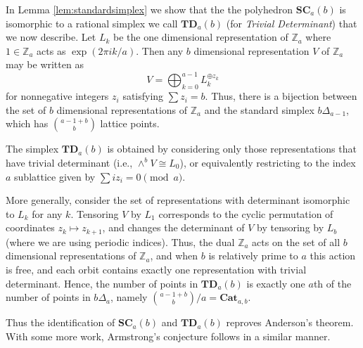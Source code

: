 \documentclass{amsart}[12pt]
\theoremstyle{definition}
\newcommand{\Z}{\mathbb{Z}}
\newcommand{\SC}{\mathbf{SC}}
\newcommand{\TD}{\mathbf{TD}}
\newcommand{\Cat}{\mathbf{Cat}}
\begin{document}
\subsubsection{}
In Lemma \ref{lem:standardsimplex} we show that the the polyhedron $\SC_a(b)$ is isomorphic to a rational simplex we call $\TD_a(b)$ (for \emph{Trivial Determinant}) that we now describe. Let $L_k$ be the one dimensional representation of $\Z_a$ where $1\in \Z_a$ acts as $\exp(2\pi ik/a)$. Then any $b$ dimensional representation $V$ of $\Z_a$ may be written as
$$V=\bigoplus_{k=0}^{a-1} L_k^{\oplus z_k}$$
for nonnegative integers $z_i$ satisfying $\sum z_i=b$. Thus, there is a bijection between the set of $b$ dimensional representations of $\Z_a$ and the standard simplex $b\Delta_{a-1}$, which has $\binom{a-1+b}{b}$ lattice points.


The simplex $\TD_a(b)$ is obtained by considering only those representations that have trivial determinant (i.e., $\wedge^b V\cong L_0$), or equivalently restricting to the index $a$ sublattice given by $\sum iz_i=0\pmod a$.


More generally, consider the set of representations with determinant isomorphic to $L_k$ for any $k$. Tensoring $V$ by $L_1$ corresponds to the cyclic permutation of coordinates $z_k\mapsto z_{k+1}$, and changes the determinant of $V$ by tensoring by $L_b$ (where we are using periodic indices). Thus, the dual $\Z_a$ acts on the set of all $b$ dimensional representations of $\Z_a$, and when $b$ is relatively prime to $a$ this action is free, and each orbit contains exactly one representation with trivial determinant. Hence, the number of points in $\TD_a(b)$ is exactly one $a$th of the number of points in $b\Delta_a$, namely $\binom{a-1+b}{b}/a=\Cat_{a,b}$.  

Thus the identification of $\SC_a(b)$ and $\TD_a(b)$ reproves Anderson's theorem. With some more work, Armstrong's conjecture follows in a similar manner.
\end{document}
